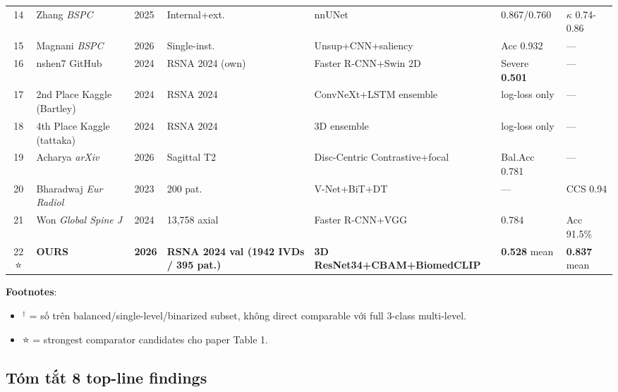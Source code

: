 \documentclass[11pt,a4paper]{article}
\newcommand{\best}[1]{\textcolor{best}{\textbf{#1}}}
\begin{document}
\begin{longtable}{@{}clp{1cm}p{2.5cm}p{2.5cm}p{2cm}p{2cm}@{}}
14 & Zhang \emph{BSPC} & 2025 & Internal+ext. & nnUNet & 0.867/0.760 & $\kappa$ 0.74-0.86 \\
15 & Magnani \emph{BSPC} & 2026 & Single-inst. & Unsup+CNN+saliency & Acc 0.932 & --- \\
16 & nshen7 GitHub & 2024 & RSNA 2024 (own) & Faster R-CNN+Swin 2D & Severe \best{0.501} & --- \\
17 & 2nd Place Kaggle (Bartley) & 2024 & RSNA 2024 & ConvNeXt+LSTM ensemble & log-loss only & --- \\
18 & 4th Place Kaggle (tattaka) & 2024 & RSNA 2024 & 3D ensemble & log-loss only & --- \\
19 & Acharya \emph{arXiv} & 2026 & Sagittal T2 & Disc-Centric Contrastive+focal & Bal.Acc 0.781 & --- \\
20 & Bharadwaj \emph{Eur Radiol} & 2023 & 200 pat. & V-Net+BiT+DT & --- & CCS 0.94 \\
21 & Won \emph{Global Spine J} & 2024 & 13,758 axial & Faster R-CNN+VGG & 0.784 & Acc 91.5\% \\
\midrule
\rowcolor{tablehdr}
22 ⭐ & \best{OURS} & \best{2026} & \best{RSNA 2024 val (1942 IVDs / 395 pat.)} & \best{3D ResNet34+CBAM+BiomedCLIP} & \best{0.528} mean & \best{0.837} mean \\
\end{longtable}

\noindent\textbf{Footnotes}:
\begin{itemize}[leftmargin=*]
\item $^\dagger$ = số trên balanced/single-level/binarized subset, không
direct comparable với full 3-class multi-level.
\item ⭐ = strongest comparator candidates cho paper Table 1.
\end{itemize}

\subsection{Tóm tắt 8 top-line findings}
\end{document}
